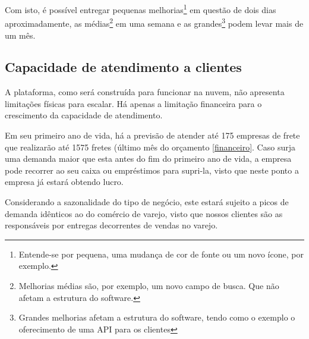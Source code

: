   Com isto, é possível entregar pequenas melhorias\footnote{Entende-se por pequena, uma mudança de cor de fonte ou um novo ícone, por exemplo.} em questão de dois dias aproximadamente, as médias\footnote{Melhorias médias são, por exemplo, um novo campo de busca. Que não afetam a estrutura do software.} em uma semana e as grandes\footnote{Grandes melhorias afetam a estrutura do software, tendo como o exemplo o oferecimento de uma API para os clientes} podem levar mais de um mês.
  
  \subsection{Capacidade de atendimento a clientes}
  A plataforma, como será construída para funcionar na nuvem, não apresenta limitações físicas para escalar. Há apenas a limitação financeira para o crescimento da capacidade de atendimento.
  
  Em seu primeiro ano de vida, há a previsão de atender até 175 empresas de frete que realizarão até 1575 fretes (último mês do orçamento \ref{financeiro}. Caso surja uma demanda maior que esta antes do fim do primeiro ano de vida, a empresa pode recorrer ao seu caixa ou empréstimos para supri-la, visto que neste ponto a empresa já estará obtendo lucro.
  
  Considerando a sazonalidade do tipo de negócio, este estará sujeito a picos de demanda idênticos ao do comércio de varejo, visto que nossos clientes são as responsáveis por entregas decorrentes de vendas no varejo.
